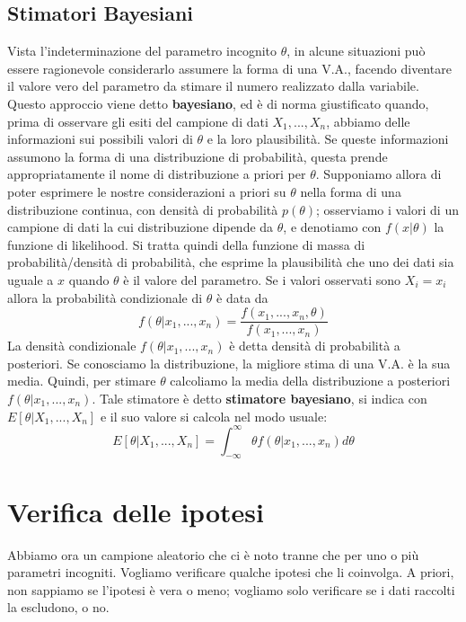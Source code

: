 \documentclass[11pt]{article}
\begin{document}
\subsection{Stimatori Bayesiani}
Vista l'indeterminazione del parametro incognito $\theta$, in alcune situazioni può essere ragionevole considerarlo assumere la forma di una V.A., facendo diventare il valore vero del parametro da stimare il numero realizzato dalla variabile. Questo approccio viene detto \textbf{bayesiano}, ed è di norma giustificato quando, prima di osservare gli esiti del campione di dati $X_1,...,X_n$, abbiamo delle informazioni sui possibili valori di $\theta$ e la loro plausibilità. Se queste informazioni assumono la forma di una distribuzione di probabilità, questa prende appropriatamente il nome di distribuzione a priori per $\theta$. Supponiamo allora di poter esprimere le nostre considerazioni a priori su $\theta$ nella forma di una distribuzione continua, con densità di probabilità $p(\theta)$; osserviamo i valori di un campione di dati la cui distribuzione dipende da $\theta$, e denotiamo con $f(x|\theta)$ la funzione di likelihood. Si tratta quindi della funzione di massa di probabilità/densità di probabilità, che esprime la plausibilità che uno dei dati sia uguale a $x$ quando $\theta$ è il valore del parametro. Se i valori osservati sono $X_i=x_i$ allora la probabilità condizionale di $\theta$ è data da
\begin{displaymath}
    f(\theta|x_1,...,x_n) = \frac{f(x_1,...,x_n,\theta)}{f(x_1,...,x_n)}
\end{displaymath}  
La densità condizionale $f(\theta|x_1,...,x_n)$ è detta densità di probabilità a posteriori. Se conosciamo la distribuzione, la migliore stima di una V.A. è la sua media. Quindi, per stimare $\theta$ calcoliamo la media della distribuzione a posteriori $f(\theta|x_1,...,x_n)$. Tale stimatore è detto \textbf{stimatore bayesiano}, si indica con $E[\theta|X_1,...,X_n]$ e il suo valore si calcola nel modo usuale:
\begin{displaymath}
    E[\theta|X_1,...,X_n] = \int_{-\infty}^\infty \theta f(\theta | x_1,...,x_n) d\theta
\end{displaymath}
\section{Verifica delle ipotesi}
Abbiamo ora un campione aleatorio che ci è noto tranne che per uno o più parametri incogniti. Vogliamo verificare qualche ipotesi che li coinvolga. A priori, non sappiamo se l'ipotesi è vera o meno; vogliamo solo verificare se i dati raccolti la escludono, o no.
\end{document}
